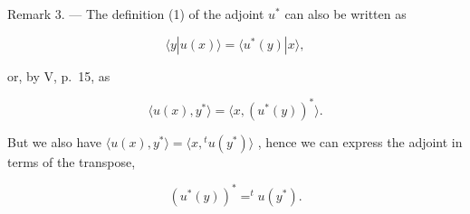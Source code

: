 Remark 3. --- The definition (1) of the adjoint \(u^{*}\) can also be written as

\[
\langle y | u (x) \rangle = \langle u ^ {*} (y) | x \rangle ,
\]

or, by V, p.~15, as

\[
\langle u (x), y ^ {*} \rangle = \langle x, (u ^ {*} (y)) ^ {*} \rangle .
\]

But we also have \(\langle u(x), y^* \rangle = \langle x, {}^t u(y^*) \rangle\) , hence we can express the adjoint in terms of the transpose,

\[
(u ^ {*} (y)) ^ {*} = ^ {t} u (y ^ {*}).
\]

